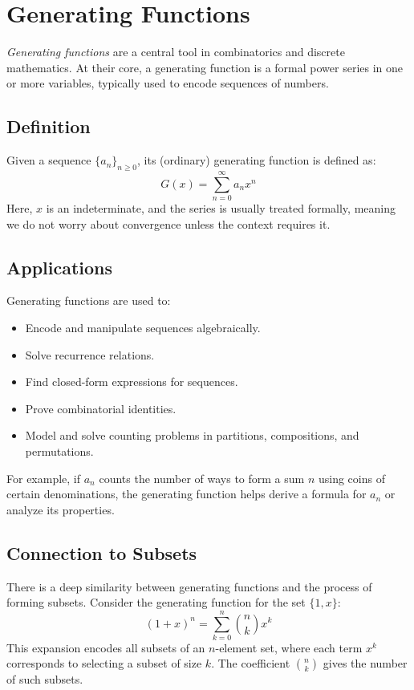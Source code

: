 \section{Generating Functions}

\emph{Generating functions} are a central tool in 
combinatorics and discrete mathematics. At their core, a 
generating function is a formal power series in one or more variables, 
typically used to encode sequences of numbers.

\subsection{Definition}

Given a sequence \( \{a_n\}_{n \ge 0} \), its (ordinary) generating function is defined as:
\[
G(x) = \sum_{n=0}^{\infty} a_n x^n
\]
Here, \( x \) is an indeterminate, and the series is usually treated formally, meaning we do not worry about convergence unless the context requires it.

\subsection{Applications}

Generating functions are used to:
\begin{itemize}[label=\(-\)]
  \item Encode and manipulate sequences algebraically.
  \item Solve recurrence relations.
  \item Find closed-form expressions for sequences.
  \item Prove combinatorial identities.
  \item Model and solve counting problems in partitions, compositions, and permutations.
\end{itemize}

For example, if \( a_n \) counts the number of ways to form a sum \( n \) using coins of certain denominations, the generating function helps derive a formula for \( a_n \) or analyze its properties.

\subsection{Connection to Subsets}

There is a deep similarity between generating functions and the process of forming subsets. Consider the generating function for the set \( \{1, x\} \):
\[
(1 + x)^n = \sum_{k=0}^n \binom{n}{k} x^k
\]
This expansion encodes all subsets of an \( n \)-element set, where each term \( x^k \) corresponds to selecting a subset of size \( k \). The coefficient \( \binom{n}{k} \) gives the number of such subsets.

